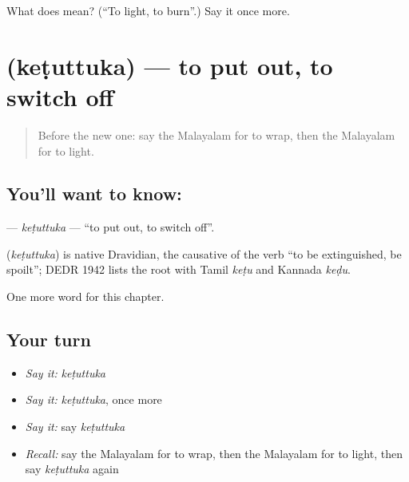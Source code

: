 \begin{tcolorbox}[breakable,colback=teal!4,colframe=teal!35!black,title={Before you move on}]
What does  mean? (\textquotedblleft{}To light, to burn\textquotedblright{}.) Say it once more.
\end{tcolorbox}
\section[\texorpdfstring{\ml{കെടുത്തുക} (keṭuttuka)}{കെടുത്തുക (keṭuttuka)}]{ (keṭuttuka) — to put out, to switch off}

\label{lesson:ML-C265-ketuttuka}



\begin{quote}
Before the new one: say the Malayalam for to wrap, then the Malayalam for to light.
\end{quote}

\subsection*{You'll want to know: }
\textbf{} — \emph{keṭuttuka} — \textquotedblleft{}to put out, to switch off\textquotedblright{}.

\begin{cousinweb}
\textbf{} (\emph{keṭuttuka}) is native Dravidian, the causative of the verb \textquotedblleft{}to be extinguished, be spoilt\textquotedblright{}; DEDR 1942 lists the root with Tamil \emph{keṭu} and Kannada \emph{keḍu}.
\end{cousinweb}

\begin{grammarlens}[title={What you've built}]
One more word for this chapter.
\end{grammarlens}

\subsection*{Your turn}
\begin{itemize}
\raggedright
  \item \emph{Say it:} \emph{keṭuttuka}
  \item \emph{Say it:} \emph{keṭuttuka}, once more
  \item \emph{Say it:} say \emph{keṭuttuka}
  \item \emph{Recall:} say the Malayalam for to wrap, then the Malayalam for to light, then say \emph{keṭuttuka} again
\end{itemize}

